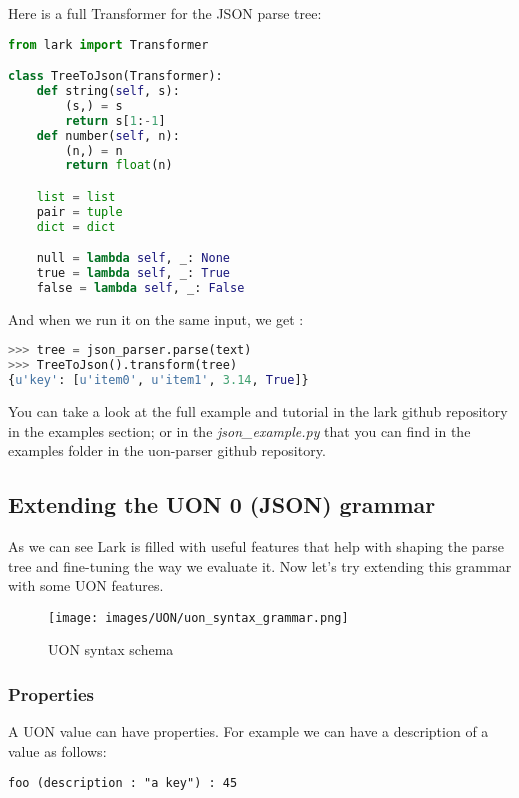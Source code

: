 \documentclass[12pt]{article}
\begin{document}
Here is a full Transformer for the JSON parse tree:

\begin{lstlisting}[language=Python]
from lark import Transformer

class TreeToJson(Transformer):
    def string(self, s):
        (s,) = s
        return s[1:-1]
    def number(self, n):
        (n,) = n
        return float(n)

    list = list
    pair = tuple
    dict = dict

    null = lambda self, _: None
    true = lambda self, _: True
    false = lambda self, _: False
\end{lstlisting}

And when we run it on the same input, we get :

\begin{lstlisting}[language=Python]
>>> tree = json_parser.parse(text)
>>> TreeToJson().transform(tree)
{u'key': [u'item0', u'item1', 3.14, True]}
\end{lstlisting}

You can take a look at the full example and tutorial in the lark github repository in the examples section; or in the \emph{json\_example.py} that you can find in the examples folder in the uon-parser github repository.


\subsection{Extending the UON 0 (JSON) grammar}

As we can see Lark is filled with useful features that help with shaping the parse tree and fine-tuning the way we evaluate it. Now let’s try extending this grammar with some UON features.

\begin{figure}[ht!]
 	\centering
 	\caption{UON syntax schema}
 	\texttt{[image: images/UON/uon\_syntax\_grammar.png]}
 	\label{lab:perceptron}
\end{figure}

\subsubsection{Properties}
A UON value can have properties. For example we can have a description of a value as follows:
\begin{lstlisting}
foo (description : "a key") : 45
\end{lstlisting}
\end{document}
